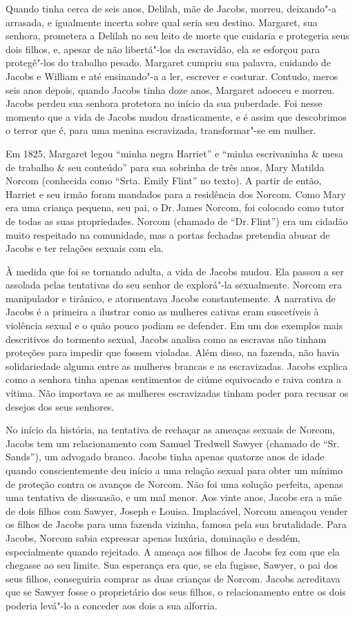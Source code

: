 Quando tinha cerca de seis anos, Delilah, mãe de Jacobs, morreu, deixando"-a
arrasada, e igualmente incerta sobre qual seria seu destino.
Margaret, sua senhora, prometera a Delilah no seu leito de morte que
cuidaria e protegeria seus dois filhos, e, apesar de não libertá"-los
da escravidão, ela se esforçou para protegê"-los do trabalho
pesado. Margaret cumpriu sua palavra, cuidando de Jacobs e William e até
ensinando"-a a ler, escrever e costurar. Contudo, meros seis anos depois,
quando Jacobs tinha doze anos, Margaret adoeceu e morreu. Jacobs perdeu
sua senhora protetora no início da sua puberdade. Foi nesse momento que
a vida de Jacobs mudou drasticamente, e é assim que descobrimos o terror que é,
para uma menina escravizada, transformar"-se em mulher.

Em 1825, Margaret legou ``minha negra Harriet'' e ``minha escrivaninha
\& mesa de trabalho \& seu conteúdo'' para sua sobrinha de três anos,
Mary Matilda Norcom (conhecida como ``Srta. Emily Flint'' no texto). A
partir de então, Harriet e seu irmão foram mandados para a residência
dos Norcom. Como Mary era uma criança pequena, seu pai, o Dr.\,James
Norcom, foi colocado como tutor de todas
as suas propriedades. Norcom (chamado de ``Dr.\,Flint'') era um cidadão
muito respeitado na comunidade, mas a portas fechadas pretendia abusar
de Jacobs e ter relações sexuais com ela.

À medida que foi se tornando adulta, a vida de Jacobs mudou. Ela passou
a ser assolada pelas tentativas do seu senhor de explorá"-la sexualmente.
Norcom era manipulador e tirânico, e atormentava Jacobs constantemente.
A narrativa de Jacobs é a primeira a ilustrar como as mulheres
cativas eram suscetíveis à violência sexual e o quão pouco podiam
se defender. Em um dos exemplos mais descritivos do tormento sexual,
Jacobs analisa como as escravas não tinham proteções para
impedir que fossem violadas. Além disso, na fazenda, não havia
solidariedade alguma entre as mulheres brancas e as escravizadas. Jacobs
explica como a senhora tinha apenas sentimentos de ciúme equivocado e
raiva contra a vítima. Não importava se as mulheres escravizadas tinham poder para recusar os desejos dos seus senhores.

No início da história, na tentativa de rechaçar as ameaças sexuais de
Norcom, Jacobs tem um relacionamento com Samuel Tredwell Sawyer (chamado
de ``Sr.\,Sands''), um advogado branco. Jacobs tinha apenas quatorze anos
de idade quando conscientemente deu início a uma relação sexual para
obter um mínimo de proteção contra os avanços de Norcom. Não foi uma
solução perfeita, apenas uma tentativa de dissuasão, e um mal menor. Aos
vinte anos, Jacobs era a mãe de dois filhos com Sawyer, Joseph e Louisa.
Implacável, Norcom ameaçou vender os filhos de Jacobs para uma fazenda
vizinha, famosa pela sua brutalidade. Para Jacobs, Norcom sabia
expressar apenas luxúria, dominação e desdém, especialmente quando
rejeitado. A ameaça aos filhos de Jacobs fez com que ela chegasse ao seu limite.
Sua esperança era que, se ela fugisse, Sawyer, o pai dos seus filhos,
conseguiria comprar as duas crianças de Norcom. Jacobs acreditava que se
Sawyer fosse o proprietário dos seus filhos, o relacionamento entre os
dois poderia levá"-lo a conceder aos dois a sua alforria.

